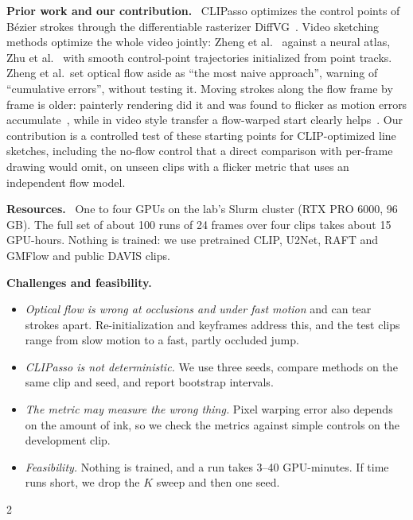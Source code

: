 \documentclass[10pt]{article}
\newcommand{\head}[1]{\textbf{\color[HTML]{1f4e8c}#1.}~}
\begin{document}
\head{Prior work and our contribution} CLIPasso optimizes the control points of B\'ezier strokes through the
differentiable rasterizer DiffVG~\citep{li2020diffvg}. Video sketching methods optimize the whole video jointly:
Zheng et al.~\citep{zheng2024sketchvideo} against a neural atlas, Zhu et al.~\citep{zhu2025vector,zhu2026hypersketch}
with smooth control-point trajectories initialized from point tracks. Zheng et al.\ set optical flow aside as ``the
most naive approach'', warning of ``cumulative errors'', without testing it. Moving strokes along the flow frame by
frame is older: painterly rendering did it and was found to flicker as motion errors
accumulate~\citep{litwinowicz1997processing,collomosse2004mid}, while in video style transfer a flow-warped start clearly
helps~\citep{ruder2016artistic}. Our contribution is a controlled test of these starting points for CLIP-optimized line
sketches, including the no-flow control that a direct comparison with per-frame drawing would omit, on unseen clips
with a flicker metric that uses an independent flow model.

\head{Resources} One to four GPUs on the lab's Slurm cluster (RTX PRO 6000, 96\,GB). The full set of about 100 runs of 24 frames over four clips takes about 15
GPU-hours. Nothing is trained: we use pretrained CLIP, U2Net, RAFT and GMFlow and public DAVIS clips.

\head{Challenges and feasibility}
\begin{itemize}
\item \emph{Optical flow is wrong at occlusions and under fast motion} and can tear strokes apart. Re-initialization
  and keyframes address this, and the test clips range from slow motion to a fast, partly occluded jump.
\item \emph{CLIPasso is not deterministic.} We use three seeds, compare methods on the same clip and seed, and report
  bootstrap intervals.
\item \emph{The metric may measure the wrong thing.} Pixel warping error also depends on the amount of ink, so we
  check the metrics against simple controls on the development clip.
\item \emph{Feasibility.} Nothing is trained, and a run takes 3--40 GPU-minutes. If time runs short, we drop the $K$ sweep and then one seed.
\end{itemize}


\vspace{-8pt}
\begin{multicols}{2}
\scriptsize


\end{multicols}
\end{document}
